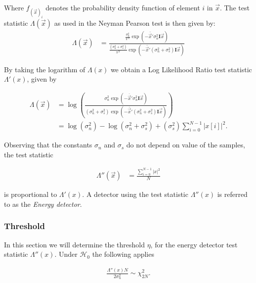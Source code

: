 \documentclass[a4paper, openany, oneside]{memoir}
\begin{document}
Where $f_{(\vec{x})_i}$ denotes the probability density function of element $i$ in $\vec{x}$.  The test statistic $\Lambda(\vec{x})$ as used in the Neyman Pearson test is then given by:
\begin{align*}
\Lambda(\vec{x}) &=\frac{\frac{\sigma_n^2}{\pi^N } \exp(-\bar{\vec{x}}'\sigma_n^2\mathbf{I}\vec{x})}{\frac{(\sigma_n^2 + \sigma_s^2)}{\pi^N } \exp(-\bar{\vec{x}}'(\sigma_n^2+\sigma_s^2)\mathbf{I}\vec{x})}
\end{align*}


By taking the logarithm of $\Lambda(x)$ we obtain a Log Likelihood Ratio test statistic $\Lambda'(x)$, given by

\begin{align*}
\Lambda(\vec{x}) &= \log \left(
\frac{\sigma_n^2\exp(-\overline{\vec{x}}'\sigma_n^2\mathbf{I}\vec{x})}{(\sigma_n^2 + \sigma_s^2)\exp(-\bar{\vec{x}}'(\sigma_n^2+\sigma_s^2)\mathbf{I}\vec{x})}\right) \\
&= \log\left(\sigma_n^2\right) - \log\left(\sigma_n^2 + \sigma_s^2\right) +  (\sigma_s^2) \sum_{i=0}^{N-1} |x[i]|^2. 
\end{align*}

Observing that the constants $\sigma_n$ and $\sigma_s$ do not depend on value of the samples, the test statistic 

\begin{align*}
\Lambda''(\vec{x}) &= \frac{\sum_{i=0}^{N-1} |x|^2}{N}
\end{align*} 

is proportional to $\Lambda'(x)$. A detector using the test statistic $\Lambda''(x)$ is  referred to as the \emph{Energy detector}. 

\subsubsection{Threshold}
In this section we will determine the threshold $\eta$, for the energy detector test statistic $\Lambda''(x)$.
Under $\mathcal{H}_0$ the following applies\cite{teguigspectrum2014}  

\begin{align}
    \frac{\Lambda''(x)N}{2\sigma_n^2} \sim \chi^2_{2N}.
\end{align}

\end{document}
